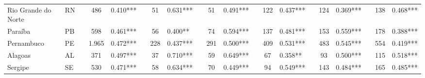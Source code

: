 \documentclass[a4paper, 12pt]{article}
\begin{document}
\begin{landscape}
\begin{table}[H]
\begin{adjustbox}{max height=\textheight,max width=\textwidth}
\begin{tabular}{p{15.28em}lclllllllllllllllll}
    Rio Grande do Norte & \multicolumn{1}{p{4.445em}}{RN} &       & \multicolumn{1}{c}{486} & \multicolumn{1}{p{7.39em}}{0.410***} &       & \multicolumn{1}{c}{51} & \multicolumn{1}{p{6.055em}}{0.631***} &       & \multicolumn{1}{c}{51} & \multicolumn{1}{p{6.055em}}{0.491***} &       & \multicolumn{1}{c}{122} & \multicolumn{1}{p{6.055em}}{0.437***} &       & \multicolumn{1}{c}{124} & \multicolumn{1}{p{6.055em}}{0.369***} &       & \multicolumn{1}{c}{138} & \multicolumn{1}{p{6.055em}}{0.468***} \\
    Paraíba & \multicolumn{1}{p{4.445em}}{PB} &       & \multicolumn{1}{c}{598} & \multicolumn{1}{p{7.39em}}{0.461***} &       & \multicolumn{1}{c}{56} & \multicolumn{1}{p{6.055em}}{0.400**} &       & \multicolumn{1}{c}{74} & \multicolumn{1}{p{6.055em}}{0.594***} &       & \multicolumn{1}{c}{137} & \multicolumn{1}{p{6.055em}}{0.481***} &       & \multicolumn{1}{c}{153} & \multicolumn{1}{p{6.055em}}{0.559***} &       & \multicolumn{1}{c}{178} & \multicolumn{1}{p{6.055em}}{0.388***} \\
    Pernambuco & \multicolumn{1}{p{4.445em}}{PE} &       & \multicolumn{1}{c}{1.965} & \multicolumn{1}{p{7.39em}}{0.472***} &       & \multicolumn{1}{c}{228} & \multicolumn{1}{p{6.055em}}{0.437***} &       & \multicolumn{1}{c}{291} & \multicolumn{1}{p{6.055em}}{0.500***} &       & \multicolumn{1}{c}{409} & \multicolumn{1}{p{6.055em}}{0.531***} &       & \multicolumn{1}{c}{483} & \multicolumn{1}{p{6.055em}}{0.545***} &       & \multicolumn{1}{c}{554} & \multicolumn{1}{p{6.055em}}{0.419***} \\
    Alagoas & \multicolumn{1}{p{4.445em}}{AL} &       & \multicolumn{1}{c}{371} & \multicolumn{1}{p{7.39em}}{0.497***} &       & \multicolumn{1}{c}{37} & \multicolumn{1}{p{6.055em}}{0.710***} &       & \multicolumn{1}{c}{59} & \multicolumn{1}{p{6.055em}}{0.649***} &       & \multicolumn{1}{c}{67} & \multicolumn{1}{p{6.055em}}{0.358**} &       & \multicolumn{1}{c}{93} & \multicolumn{1}{p{6.055em}}{0.500***} &       & \multicolumn{1}{c}{115} & \multicolumn{1}{p{6.055em}}{0.518***} \\
    Sergipe & \multicolumn{1}{p{4.445em}}{SE} &       & \multicolumn{1}{c}{530} & \multicolumn{1}{p{7.39em}}{0.471***} &       & \multicolumn{1}{c}{58} & \multicolumn{1}{p{6.055em}}{0.634***} &       & \multicolumn{1}{c}{70} & \multicolumn{1}{p{6.055em}}{0.449***} &       & \multicolumn{1}{c}{94} & \multicolumn{1}{p{6.055em}}{0.549***} &       & \multicolumn{1}{c}{143} & \multicolumn{1}{p{6.055em}}{0.484***} &       & \multicolumn{1}{c}{165} & \multicolumn{1}{p{6.055em}}{0.485***} \\

\end{tabular}
\end{adjustbox}
\end{table}
\end{landscape}
\end{document}
